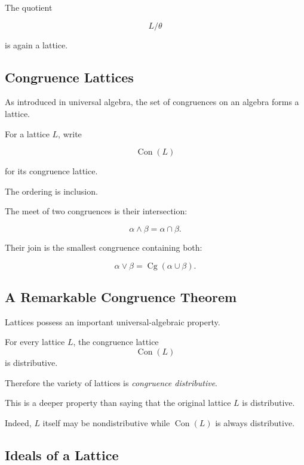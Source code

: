 The quotient

\[ L/\theta \]

is again a lattice.

\subsection{Congruence Lattices}
\label{subsec:lattice-congruence-lattices}

As introduced in universal algebra, the set of congruences on an algebra
forms a lattice.

For a lattice \(L\), write

\[ \operatorname{Con}(L) \]

for its congruence lattice.

The ordering is inclusion.

The meet of two congruences is their intersection:

\[ \alpha\wedge\beta=\alpha\cap\beta. \]

Their join is the smallest congruence containing both:

\[ \alpha\vee\beta=\operatorname{Cg}(\alpha\cup\beta). \]

\subsection{A Remarkable Congruence Theorem}
\label{subsec:lattice-congruence-distributive}

Lattices possess an important universal-algebraic property.

\begin{theorem}
For every lattice \(L\), the congruence lattice
\[ \operatorname{Con}(L) \]
is distributive.
\end{theorem}

Therefore the variety of lattices is \emph{congruence distributive}.

This is a deeper property than saying that the original lattice \(L\) is
distributive.

Indeed, \(L\) itself may be nondistributive while \(\operatorname{Con}(L)\)
is always distributive.

\subsection{Ideals of a Lattice}
\label{subsec:lattice-ideals}


